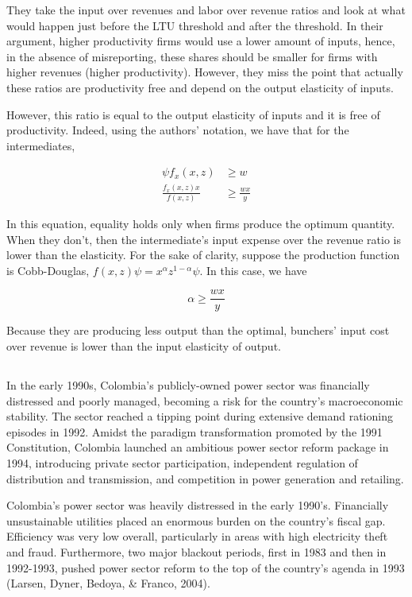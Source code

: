 \documentclass[
  12pt]{article}
\theoremstyle{definition}
\theoremstyle{remark}
\begin{document}
They take the input over revenues and labor over revenue ratios and look
at what would happen just before the LTU threshold and after the
threshold. In their argument, higher productivity firms would use a
lower amount of inputs, hence, in the absence of misreporting, these
shares should be smaller for firms with higher revenues (higher
productivity). However, they miss the point that actually these ratios
are productivity free and depend on the output elasticity of inputs.

However, this ratio is equal to the output elasticity of inputs and it
is free of productivity. Indeed, using the authors' notation, we have
that for the intermediates,

\[
\begin{aligned}
    \psi f_x(x,z) & \ge w \\
    \frac{f_x(x,z)x}{f(x,z)} & \ge \frac{wx}{y}
\end{aligned}
\]

In this equation, equality holds only when firms produce the optimum
quantity. When they don't, then the intermediate's input expense over
the revenue ratio is lower than the elasticity. For the sake of clarity,
suppose the production function is Cobb-Douglas,
\(f(x,z)\psi=x^\alpha z^{1-\alpha}\psi\). In this case, we have

\[
\alpha \ge \frac{wx}{y}
\]

Because they are producing less output than the optimal, bunchers' input
cost over revenue is lower than the input elasticity of output.

\subsection{\texorpdfstring{\citet{Rudnick2021}}{@Rudnick2021}}\label{rudnick2021}

In the early 1990s, Colombia's publicly-owned power sector was
financially distressed and poorly managed, becoming a risk for the
country's macroeconomic stability. The sector reached a tipping point
during extensive demand rationing episodes in 1992. Amidst the paradigm
transformation promoted by the 1991 Constitution, Colombia launched an
ambitious power sector reform package in 1994, introducing private
sector participation, independent regulation of distribution and
transmission, and competition in power generation and retailing.

Colombia's power sector was heavily distressed in the early 1990's.
Financially unsustainable utilities placed an enormous burden on the
country's fiscal gap. Efficiency was very low overall, particularly in
areas with high electricity theft and fraud. Furthermore, two major
blackout periods, first in 1983 and then in 1992-1993, pushed power
sector reform to the top of the country's agenda in 1993 (Larsen, Dyner,
Bedoya, \& Franco, 2004).
\end{document}
